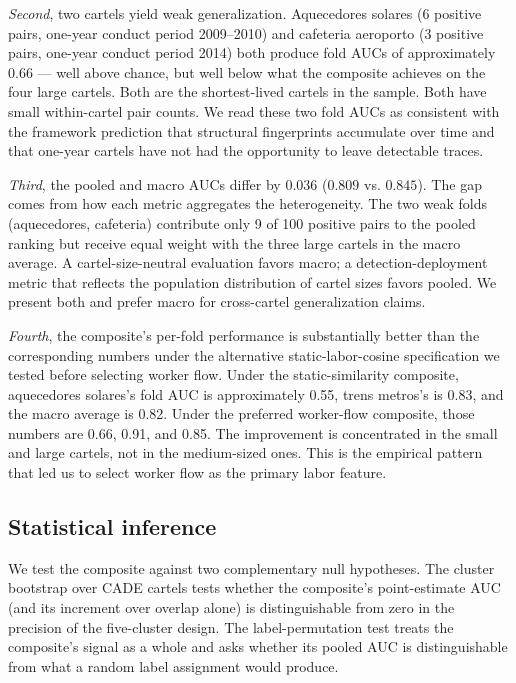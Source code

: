 \emph{Second}, two cartels yield weak generalization. Aquecedores solares (6 positive pairs, one-year conduct period 2009--2010) and cafeteria aeroporto (3 positive pairs, one-year conduct period 2014) both produce fold AUCs of approximately 0.66 --- well above chance, but well below what the composite achieves on the four large cartels. Both are the shortest-lived cartels in the sample. Both have small within-cartel pair counts. We read these two fold AUCs as consistent with the framework prediction that structural fingerprints accumulate over time and that one-year cartels have not had the opportunity to leave detectable traces.

\emph{Third}, the pooled and macro AUCs differ by $0.036$ ($0.809$ vs. $0.845$). The gap comes from how each metric aggregates the heterogeneity. The two weak folds (aquecedores, cafeteria) contribute only 9 of 100 positive pairs to the pooled ranking but receive equal weight with the three large cartels in the macro average. A cartel-size-neutral evaluation favors macro; a detection-deployment metric that reflects the population distribution of cartel sizes favors pooled. We present both and prefer macro for cross-cartel generalization claims.

\emph{Fourth}, the composite's per-fold performance is substantially better than the corresponding numbers under the alternative static-labor-cosine specification we tested before selecting worker flow. Under the static-similarity composite, aquecedores solares's fold AUC is approximately 0.55, trens metros's is 0.83, and the macro average is 0.82. Under the preferred worker-flow composite, those numbers are 0.66, 0.91, and 0.85. The improvement is concentrated in the small and large cartels, not in the medium-sized ones. This is the empirical pattern that led us to select worker flow as the primary labor feature.

\subsection{Statistical inference}\label{sec:res_inference_main}

We test the composite against two complementary null hypotheses. The cluster bootstrap over CADE cartels tests whether the composite's point-estimate AUC (and its increment over overlap alone) is distinguishable from zero in the precision of the five-cluster design. The label-permutation test treats the composite's signal as a whole and asks whether its pooled AUC is distinguishable from what a random label assignment would produce.

